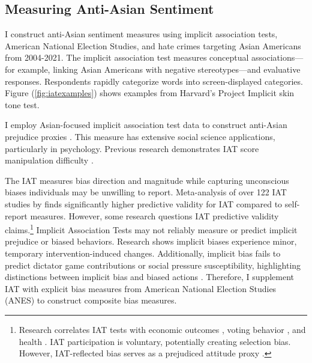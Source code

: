 \subsection{Measuring Anti-Asian Sentiment}

I construct anti-Asian sentiment measures using implicit association tests, American National Election Studies, and hate crimes targeting Asian Americans from 2004-2021. The implicit association test measures conceptual associations—for example, linking Asian Americans with negative stereotypes—and evaluative responses. Respondents rapidly categorize words into screen-displayed categories. Figure (\ref{fig:iatexamples}) shows examples from Harvard's Project Implicit skin tone test.

I employ Asian-focused implicit association test data to construct anti-Asian prejudice proxies \autocite{greenwaldMeasuringIndividualDifferences1998}. This measure has extensive social science applications, particularly in psychology. Previous research demonstrates IAT score manipulation difficulty \autocite{egloffPredictiveValidityImplicit2002}.

The IAT measures bias direction and magnitude while capturing unconscious biases individuals may be unwilling to report. Meta-analysis of over 122 IAT studies by \textcite{greenwaldMeasuringIndividualDifferences1998} finds significantly higher predictive validity for IAT compared to self-report measures. However, some research questions IAT predictive validity claims.\footnote{Research correlates IAT tests with economic outcomes \autocite{chettyRaceEconomicOpportunity2020,gloverDiscriminationSelfFulfillingProphecy2017}, voting behavior \autocite{friesePredictingVotingBehavior2007}, and health \autocite{leitnerRacialBiasAssociated2016}. IAT participation is voluntary, potentially creating selection bias. However, IAT-reflected bias serves as a prejudiced attitude proxy \autocite{chettyRaceEconomicOpportunity2020}.} Implicit Association Tests may not reliably measure or predict implicit prejudice or biased behaviors. Research shows implicit biases experience minor, temporary intervention-induced changes. Additionally, implicit bias fails to predict dictator game contributions or social pressure susceptibility, highlighting distinctions between implicit bias and biased actions \autocite{arkesAttributionsImplicitPrejudice2004,forscherMetaanalysisProceduresChange2019,leeDoesImplicitBias2018}. Therefore, I supplement IAT with explicit bias measures from American National Election Studies (ANES) to construct composite bias measures.

